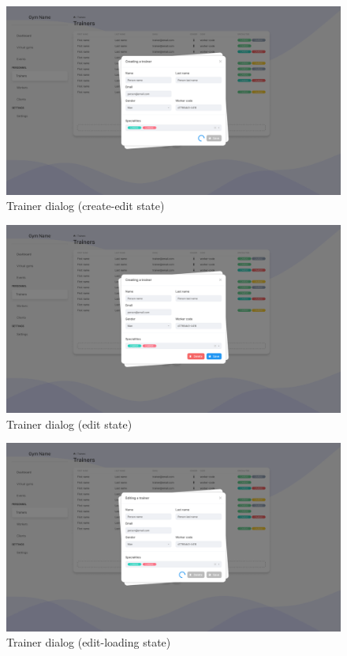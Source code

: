 \documentclass[a4paper, 12pt, oneside]{book}
\begin{document}
\begin{figure}[H]
	\centering
	\includegraphics[width=\textwidth]{assets/ui/TrainerCreateLoading.png}
	\caption{Trainer dialog (create-edit state)}
\end{figure}
\begin{figure}[H]
	\centering
	\includegraphics[width=\textwidth]{assets/ui/TrainerEdit.png}
	\caption{Trainer dialog (edit state)}
\end{figure}
\begin{figure}[H]
	\centering
	\includegraphics[width=\textwidth]{assets/ui/TrainerEditLoading.png}
	\caption{Trainer dialog (edit-loading state)}
\end{figure}
\end{document}
